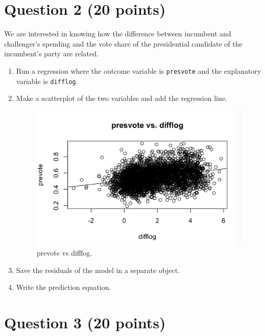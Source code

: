 \documentclass[12pt,letterpaper]{article}
\begin{document}
	\newpage
	
	\section*{Question 2 (20 points)}
	\noindent We are interested in knowing how the difference between incumbent and challenger's spending and the vote share of the presidential candidate of the incumbent's party are related.	\vspace{.25cm}
	\begin{enumerate}
		\item Run a regression where the outcome variable is \texttt{presvote} and the explanatory variable is \texttt{difflog}.	
			  
		\item Make a scatterplot of the two variables and add the regression line. 
			  
			\begin{figure}[h!]
				\includegraphics[width=\linewidth]{PS32}
				\caption{prevote vs difflog.}
				\label{fig:PS32}
			\end{figure}
		\item Save the residuals of the model in a separate object.	
			  
		\item Write the prediction equation.
			  
	\end{enumerate}
	
	\newpage	
	\section*{Question 3 (20 points)}
	
\end{document}

